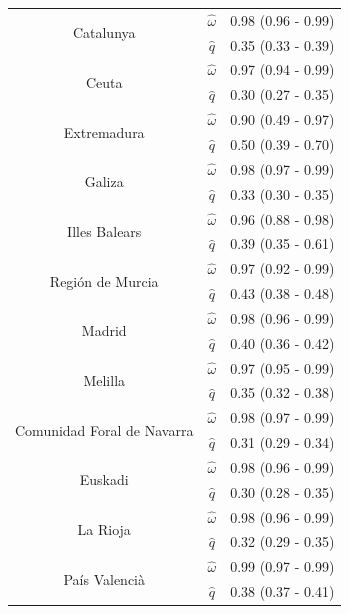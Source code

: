 \documentclass[twoside]{report}
\begin{document}
\begin{table}[!ht]
\begin{tabular}{ccc}
\cmidrule{1-3}
\multirow{2}{*}{Catalunya}    & $\hat{\omega}$  & 0.98 (0.96 - 0.99) \\
                               & $\hat{q}$       & 0.35 (0.33 - 0.39) \\
\cmidrule{1-3}
\multirow{2}{*}{Ceuta}    & $\hat{\omega}$  & 0.97 (0.94 - 0.99) \\
                               & $\hat{q}$       & 0.30 (0.27 - 0.35) \\
\cmidrule{1-3}
\multirow{2}{*}{Extremadura}    & $\hat{\omega}$  & 0.90 (0.49 - 0.97) \\
                                & $\hat{q}$       & 0.50 (0.39 - 0.70) \\
\cmidrule{1-3}
\multirow{2}{*}{Galiza}     & $\hat{\omega}$  & 0.98 (0.97 - 0.99) \\
                             & $\hat{q}$       & 0.33 (0.30 - 0.35) \\
\cmidrule{1-3}
\multirow{2}{*}{Illes Balears}    & $\hat{\omega}$  & 0.96 (0.88 - 0.98) \\
                                   & $\hat{q}$       & 0.39 (0.35 - 0.61) \\
\cmidrule{1-3}
\multirow{2}{*}{Regi\'on de Murcia}    & $\hat{\omega}$  & 0.97 (0.92 - 0.99) \\
                                       & $\hat{q}$       & 0.43 (0.38 - 0.48) \\
\cmidrule{1-3}
\multirow{2}{*}{Madrid}      & $\hat{\omega}$  & 0.98 (0.96 - 0.99) \\
                             & $\hat{q}$       & 0.40 (0.36 - 0.42) \\
\cmidrule{1-3}
\multirow{2}{*}{Melilla}    & $\hat{\omega}$  & 0.97 (0.95 - 0.99) \\
                               & $\hat{q}$       & 0.35 (0.32 - 0.38) \\
\cmidrule{1-3}
\multirow{2}{*}{Comunidad Foral de Navarra}    & $\hat{\omega}$  & 0.98 (0.97 - 0.99) \\
                                               & $\hat{q}$       & 0.31 (0.29 - 0.34) \\
\cmidrule{1-3}
\multirow{2}{*}{Euskadi}    & $\hat{\omega}$  & 0.98 (0.96 - 0.99) \\
                               & $\hat{q}$       & 0.30 (0.28 - 0.35) \\
\cmidrule{1-3}
\multirow{2}{*}{La Rioja}    & $\hat{\omega}$  & 0.98 (0.96 - 0.99) \\
                             & $\hat{q}$       & 0.32 (0.29 - 0.35) \\
\cmidrule{1-3}
\multirow{2}{*}{Pa\'is Valenci\`a}    & $\hat{\omega}$  & 0.99 (0.97 - 0.99) \\
                                         & $\hat{q}$       & 0.38 (0.37 - 0.41) \\
\bottomrule[0.09 em]
\end{tabular}
\end{table}
\end{document}
